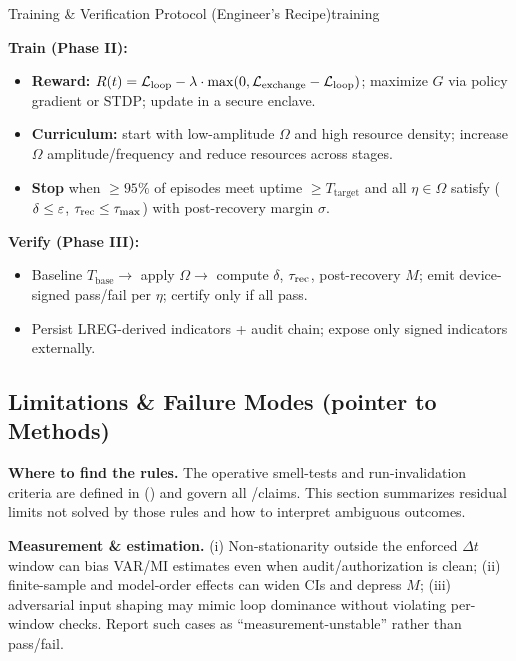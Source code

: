 \documentclass[11pt]{article}
\begin{document}
\begin{docbox}{Training \& Verification Protocol (Engineer's Recipe)}{training}

\textbf{Train (Phase II):}
\begin{itemize}
\item \textbf{Reward:} $R(t) = \mathcal{L}_{\text{loop}} - \lambda \cdot \max(0, \mathcal{L}_{\text{exchange}} - \mathcal{L}_{\text{loop}})$; maximize $G$ via policy gradient or STDP; update in a secure enclave.
\item \textbf{Curriculum:} start with low-amplitude $\Omega$ and high resource density; increase $\Omega$ amplitude/frequency and reduce resources across stages.
\item \textbf{Stop} when $\geq 95\%$ of episodes meet \NC uptime $\geq T_{\text{target}}$ and all $\eta \in \Omega$ satisfy \SC ($\delta \leq \varepsilon$, $\tau_{\text{rec}} \leq \tau_{\max}$) with post-recovery margin $\sigma$.
\end{itemize}

\textbf{Verify (Phase III):}
\begin{itemize}
\item Baseline $T_{\text{base}} \rightarrow$ apply $\Omega \rightarrow$ compute $\delta$, $\tau_{\text{rec}}$, post-recovery $M$; emit device-signed pass/fail per $\eta$; certify only if all pass.
\item Persist LREG-derived indicators + audit chain; expose only signed indicators externally.
\end{itemize}
\end{docbox}

\subsection{Limitations \& Failure Modes (pointer to Methods)}

\textbf{Where to find the rules.} The operative smell-tests and run-invalidation criteria are defined in  () and govern all \NC/\SC claims. This section summarizes residual limits not solved by those rules and how to interpret ambiguous outcomes.

\textbf{Measurement \& estimation.} (i) Non-stationarity outside the enforced $\Delta t$ window can bias VAR/MI estimates even when audit/authorization is clean; (ii) finite-sample and model-order effects can widen CIs and depress $M$; (iii) adversarial input shaping may mimic loop dominance without violating per-window checks. Report such cases as ``measurement-unstable'' rather than pass/fail.
\end{document}
